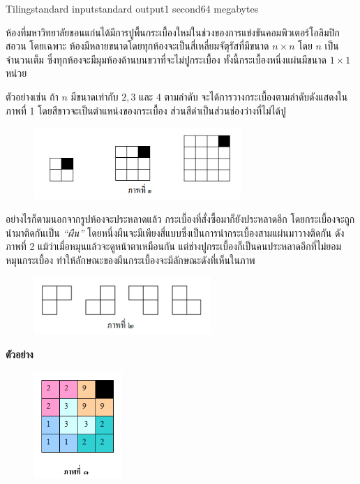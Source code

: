 \documentclass[11pt,a4paper]{article}
\begin{document}
\begin{problem}{Tiling}{standard input}{standard output}{1 second}{64 megabytes}

ห้องที่มหาวิทยาลัยขอนแก่นได้มีการปูพื้นกระเบื้องใหม่ในช่วงของการแข่งขันคอมพิวเตอร์โอลิมปิก สอวน โดยเฉพาะ ห้องมีหลายขนาดโดยทุกห้องจะเป็นสี่เหลี่ยมจัตุรัสที่มีขนาด $n \times n$ โดย $n$ เป็นจำนวนเต็ม ซึ่งทุกห้องจะมีมุมห้องด้านบนขวาที่จะไม่ปูกระเบื้อง ทั้งนี้กระเบื้องหนึ่งแผ่นมีขนาด $1 \times 1$ หน่วย



ตัวอย่างเช่น ถ้า $n$ มีขนาดเท่ากับ $2, 3$ และ $4$ ตามลำดับ จะได้การวางกระเบื้องตามลำดับดังแสดงในภาพที่ 1 โดยสีขาวจะเป็นตำแหน่งของกระเบื้อง ส่วนสีดำเป็นส่วนช่องว่างที่ไม่ได้ปู

\begin{figure}[h]
\centering
\includegraphics[width=0.7\textwidth]{../latex/img/1015/1015-1.png}
\end{figure}

อย่างไรก็ตามนอกจากรูปห้องจะประหลาดแล้ว กระเบื้องที่สั่งซื้อมาก็ยังประหลาดอีก โดยกระเบื้องจะถูกนำมาติดกันเป็น \textit{“ผืน”} โดยหนึ่งผืนจะมีเพียงสี่แบบซึ่งเป็นการนำกระเบื้องสามแผ่นมาวางติดกัน ดังภาพที่ 2 แม้ว่าเมื่อหมุนแล้วจะดูหน้าตาเหมือนกัน แต่ช่างปูกระเบื้องก็เป็นคนประหลาดอีกที่ไม่ยอมหมุนกระเบื้อง ทำให้ลักษณะของผืนกระเบื้องจะมีลักษณะดังที่เห็นในภาพ

\begin{figure}[h]
\centering
\includegraphics[width=0.6\textwidth]{../latex/img/1015/1015-2.png}
\end{figure}
\newpage
\textbf{ตัวอย่าง}

\begin{figure}[h]
\centering
\includegraphics[width=0.3\textwidth]{../latex/img/1015/1015-3.png}
\end{figure}



\end{problem}
\end{document}
